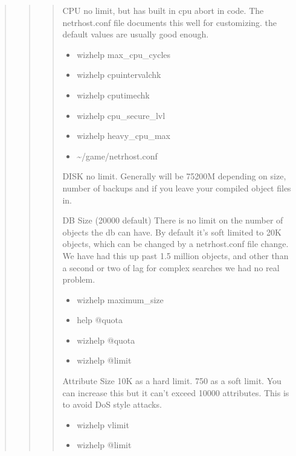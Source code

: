 \documentclass[letterpaper,10pt,english]{sphinxmanual}
\begin{document}
\begin{quote}
\begin{quote}
\begin{quote}
\sphinxAtStartPar
CPU  \sphinxhyphen{} no limit, but has built in cpu abort in code.  The netrhost.conf file documents this well for customizing.  the default values are usually good enough.
\begin{itemize}
\item {} 
\sphinxAtStartPar
wizhelp max\_cpu\_cycles

\item {} 
\sphinxAtStartPar
wizhelp cpuintervalchk

\item {} 
\sphinxAtStartPar
wizhelp cputimechk

\item {} 
\sphinxAtStartPar
wizhelp cpu\_secure\_lvl

\item {} 
\sphinxAtStartPar
wizhelp heavy\_cpu\_max

\item {} 
\sphinxAtStartPar
\textasciitilde{}/game/netrhost.conf

\end{itemize}

\sphinxAtStartPar
DISK \sphinxhyphen{} no limit.  Generally will be 75\sphinxhyphen{}200M depending on size, number of backups and if you leave your compiled object files in.

\sphinxAtStartPar
DB Size \sphinxhyphen{} (20000 default) There is no limit on the number of objects the db can have.  By default it’s soft limited to 20K objects, which can be changed by a netrhost.conf file change.  We have had this up past 1.5 million objects, and other than a second or two of lag for complex searches we had no real problem.
\begin{itemize}
\item {} 
\sphinxAtStartPar
wizhelp maximum\_size

\item {} 
\sphinxAtStartPar
help @quota

\item {} 
\sphinxAtStartPar
wizhelp @quota

\item {} 
\sphinxAtStartPar
wizhelp @limit

\end{itemize}

\sphinxAtStartPar
Attribute Size \sphinxhyphen{} 10K as a hard limit.  750 as a soft limit.  You can increase this but it can’t exceed 10000 attributes.  This is to avoid DoS style attacks.
\begin{itemize}
\item {} 
\sphinxAtStartPar
wizhelp vlimit

\item {} 
\sphinxAtStartPar
wizhelp @limit

\end{itemize}
\end{quote}
\end{quote}
\end{quote}
\end{document}
